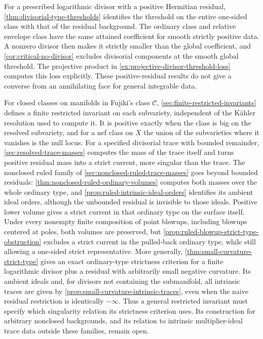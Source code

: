 For a prescribed logarithmic divisor with a positive Hermitian residual, \cref{thm:divisorial-type-thresholds} identifies the threshold on the entire one-sided class with that of the residual background. The ordinary class and relative envelope class have the same attained coefficient for smooth strictly positive data. A nonzero divisor then makes it strictly smaller than the global coefficient, and \cref{cor:critical-no-divisor} excludes divisorial components at the smooth global threshold. The projective product in \cref{ex:projective-divisor-threshold-loss} computes this loss explicitly. These positive-residual results do not give a converse from an annihilating face for general integrable data.

For closed classes on manifolds in Fujiki's class $\mathcal C$, \cref{sec:finite-restricted-invariants} defines a finite restricted invariant on each subvariety, independent of the K\"ahler resolution used to compute it. It is positive exactly when the class is big on the resolved subvariety, and for a nef class on $X$ the union of the subvarieties where it vanishes is the null locus. For a specified divisorial trace with bounded remainder, \cref{sec:resolved-trace-masses} computes the mass of the trace itself and turns positive residual mass into a strict current, more singular than the trace. The nonclosed ruled family of \cref{sec:nonclosed-ruled-trace-masses} goes beyond bounded residuals: \cref{thm:nonclosed-ruled-ordinary-volumes} computes both masses over the whole ordinary type, and \cref{prop:ruled-intrinsic-ideal-orders} identifies its ambient ideal orders, although the unbounded residual is invisible to those ideals. Positive lower volume gives a strict current in that ordinary type on the surface itself. Under every nonempty finite composition of point blowups, including blowups centered at poles, both volumes are preserved, but \cref{prop:ruled-blowup-strict-type-obstruction} excludes a strict current in the pulled-back ordinary type, while still allowing a one-sided strict representative. More generally, \cref{thm:small-curvature-strict-type} gives an exact ordinary-type strictness criterion for a finite logarithmic divisor plus a residual with arbitrarily small negative curvature. Its ambient ideals and, for divisors not containing the submanifold, all intrinsic traces are given by \cref{prop:small-curvature-intrinsic-traces}, even when the naive residual restriction is identically $-\infty$. Thus a general restricted invariant must specify which singularity relation its strictness criterion uses. Its construction for arbitrary nonclosed backgrounds, and its relation to intrinsic multiplier-ideal trace data outside these families, remain open.

